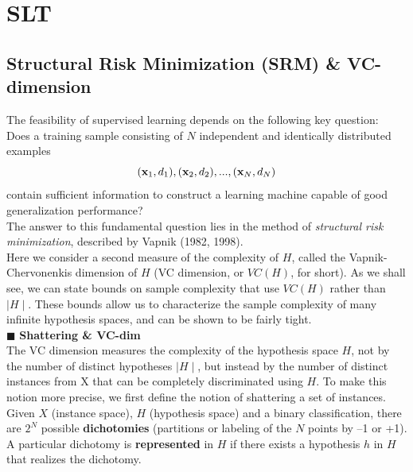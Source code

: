 \documentclass[../main.tex]{subfiles}
\begin{document}
\section{SLT}
\subsection{Structural Risk Minimization (SRM) \& VC-dimension}
The feasibility of supervised learning depends on the following key question:\\
Does a training sample consisting of $N$ independent and identically distributed examples
$$(\bold{x}_1,d_1),(\bold{x}_2,d_2),...,(\bold{x}_N,d_N)$$
contain sufficient information to construct a learning machine capable of good generalization performance?\\
The answer to this fundamental question lies in the method of \emph{structural risk minimization}, described by Vapnik (1982, 1998).\\

\noindent Here we consider a second measure of the complexity of $H$, called the Vapnik-Chervonenkis dimension of $H$ (VC dimension, or $VC(H)$, for short). As we shall see, we can state bounds on sample complexity that use $VC(H)$ rather than $\mid H \mid$. These bounds allow us to characterize the sample complexity of many infinite hypothesis spaces, and can be shown to be fairly tight.\\

\noindent $\blacksquare$ \textbf{Shattering \& VC-dim}\\
The VC dimension measures the complexity of the hypothesis space $H$, not by the
number of distinct hypotheses $\mid H \mid$, but instead by the number of distinct instances from X that can be completely discriminated using $H$. To make this notion more precise, we first define the notion of shattering a set of instances.\\ 

\noindent Given $X$ (instance space), $H$ (hypothesis space) and a binary classification, there are $2^N$ possible \textbf{dichotomies} (partitions or labeling of the $N$ points by –1 or +1). A particular dichotomy is \textbf{represented} in $H$ if there exists a hypothesis $h$ in $H$ that realizes the dichotomy.\\
\end{document}
